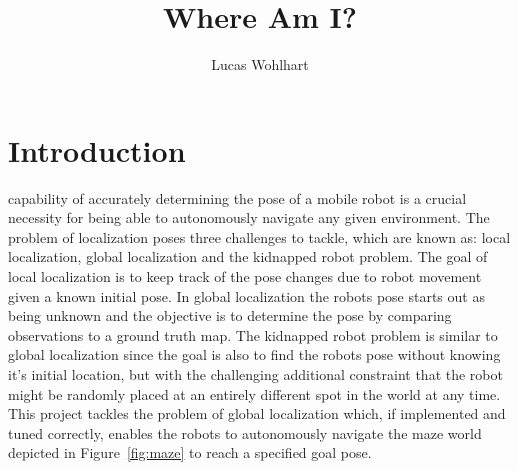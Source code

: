 \documentclass[10pt,journal,compsoc]{IEEEtran}
\begin{document}
\title{Where Am I?}

\author{Lucas Wohlhart}

%
{}


\maketitle
\IEEEdisplaynontitleabstractindextext
\IEEEpeerreviewmaketitle
\section{Introduction}
\label{sec:introduction}

 capability of accurately determining the pose of a mobile robot is a crucial necessity for being able to autonomously navigate any given environment.
The problem of localization poses three challenges to tackle, which are known as: local localization, global localization and the kidnapped robot problem.
The goal of local localization is to keep track of the pose changes due to robot movement given a known initial pose. In global localization the robots pose starts out as being unknown and the objective is to determine the pose by comparing observations to a ground truth map. The kidnapped robot problem is similar to global localization since the goal is also to find the robots pose without knowing it's initial location, but with the challenging additional constraint that the robot might be randomly placed at an entirely different spot in the world at any time. 
This project tackles the problem of global localization which, if implemented and tuned correctly, enables the robots to autonomously navigate the maze world depicted in Figure~\ref{fig:maze} to reach a specified goal pose. 
\end{document}
